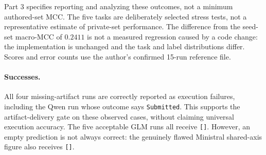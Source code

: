 \documentclass[11pt]{article}
\begin{document}
Part 3 specifies reporting and analyzing these outcomes, not a minimum
authored-set MCC. The five tasks are deliberately selected stress tests,
not a representative estimate of private-set performance.
The difference from the seed-set macro-MCC of $0.2411$ is not a measured
regression caused by a code change: the implementation is unchanged and
the task and label distributions differ.
Scores and error counts use the author's confirmed 15-run reference file.

\paragraph{Successes.}
All four missing-artifact runs are correctly reported as execution failures,
including the Qwen run whose outcome says \texttt{Submitted}.
This supports the artifact-delivery gate on these observed cases, without
claiming universal execution accuracy.
The five acceptable GLM runs all receive \texttt{[]}.
However, an empty prediction is not always correct: the genuinely flawed
Ministral shared-axis figure also receives \texttt{[]}.
\end{document}
